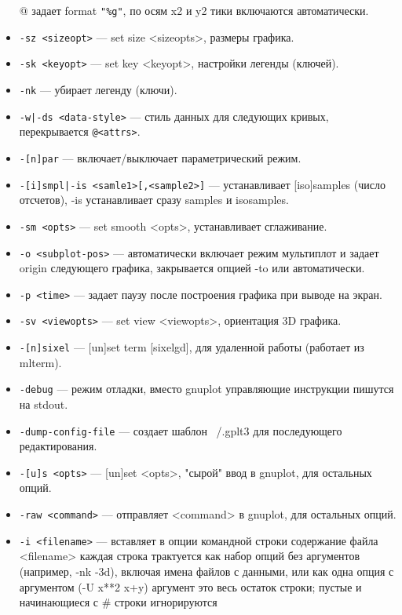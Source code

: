 \documentclass[12pt]{article}
\begin{document}
\begin{itemize}
             @ задает format \verb'"%g"', по осям x2 и y2 тики включаются автоматически. 
\item \verb'-sz <sizeopt>' ---  set size <sizeopts>, размеры графика. 
\item \verb'-sk <keyopt>' --- set key <keyopt>, настройки легенды (ключей).
\item \verb'-nk' --- убирает легенду (ключи). 
\item \verb'-w|-ds <data-style>'  --- стиль данных для следующих кривых, перекрывается \verb'@<attrs>'.
\item \verb'-[n]par' --- включает/выключает параметрический режим.
\item \verb'-[i]smpl|-is <samle1>[,<sample2>]' --- устанавливает [iso]samples (число отсчетов), 
                                     -is устанавливает сразу samples и isosamples.
\item \verb'-sm <opts>' --- set smooth <opts>, устанавливает сглаживание.
\item \verb'-o <subplot-pos>' --- автоматически включает режим мультиплот и задает origin 
   следующего графика, закрывается опцией -to или автоматически.
\item \verb'-p <time>' --- задает паузу после построения графика при выводе на экран.
\item \verb'-sv <viewopts>' --- set view <viewopts>, ориентация 3D графика.
\item \verb'-[n]sixel' --- [un]set term [sixelgd], для удаленной работы (работает из mlterm).
\item \verb'-debug' --- режим отладки, вместо gnuplot управляющие инструкции пишутся на stdout.
\item \verb'-dump-config-file' --- создает шаблон ~/.gplt3 для последующего редактирования.
\item \verb'-[u]s <opts>' --- [un]set <opts>, "сырой" ввод в gnuplot, для остальных опций.
\item \verb'-raw <command>' --- отправляет <command> в gnuplot, для остальных опций.
\item \verb'-i <filename>' --- вставляет в опции командной строки содержание файла <filename>
   каждая строка трактуется как набор опций без аргументов (например, -nk -3d), 
   включая имена файлов с данными, или как одна опция с аргументом (-U x**2 x+y)
   аргумент это весь остаток строки; пустые и начинающиеся с \# строки игнорируются
\end{itemize}
\end{document}
